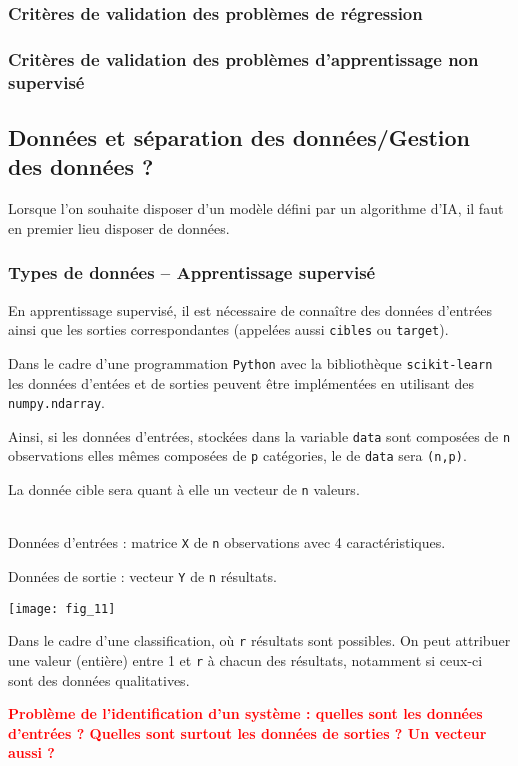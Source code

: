 \begin{defi}

\end{defi}

\subsubsection{Critères de validation des problèmes de régression}

\subsubsection{Critères de validation des problèmes d'apprentissage non supervisé}

\subsection{Données et séparation des données/Gestion des données ?}
Lorsque l'on souhaite disposer d'un modèle défini par un algorithme d'IA, il faut en premier lieu disposer de données. 

\subsubsection{Types de données -- Apprentissage supervisé}

En apprentissage supervisé, il est nécessaire de connaître des données d'entrées ainsi que les sorties correspondantes (appelées aussi \texttt{cibles} ou \texttt{target}).

Dans le cadre d'une programmation \texttt{Python} avec la bibliothèque \texttt{scikit-learn} les données d'entées et de sorties peuvent être implémentées en utilisant des \texttt{numpy.ndarray}.

Ainsi, si les données d'entrées, stockées dans la variable \texttt{data} sont composées de \texttt{n} observations elles mêmes composées de \texttt{p} catégories, le  de \texttt{data} sera \texttt{(n,p)}.

La donnée cible sera quant à elle un vecteur de \texttt{n} valeurs. 

\begin{exemple}~\\

Données d'entrées  : matrice  \texttt{X} de \texttt{n} observations avec 4 caractéristiques. 

Données de sortie : vecteur \texttt{Y} de \texttt{n} résultats. 
\begin{center}
\texttt{[image: fig\_11]}
\end{center}

Dans le cadre d'une classification, où \texttt{r} résultats sont possibles. On peut attribuer une valeur (entière) entre 1 et \texttt{r} à chacun des résultats, notamment si ceux-ci sont des données qualitatives.

\textcolor{red}{\textbf{Problème de l'identification d'un système : quelles sont les données d'entrées ? Quelles sont surtout les données de sorties ? Un vecteur aussi ?}}

\end{exemple}


